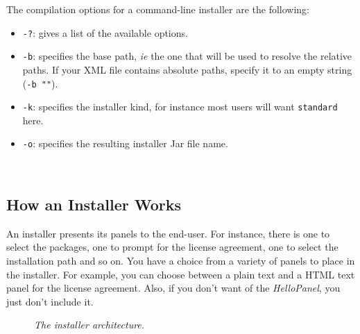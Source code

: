 The compilation options for a command-line installer are the following:
\begin{itemize}
\item \texttt{-?}: gives a list of the available options.
\item \texttt{-b}: specifies the base path, \textsl{ie} the one that will be
used to resolve the relative paths. If your XML file contains absolute paths,
specify it to an empty string (\texttt{-b ""}).
\item \texttt{-k}: specifies the installer kind, for instance most users will
want \texttt{standard} here.
\item \texttt{-o}: specifies the resulting installer Jar file name.
\end{itemize}\

\subsection{How an Installer Works}

An installer presents its panels to the end-user. For instance, there is
one to select the packages, one to prompt for the license agreement, one
to select the installation path and so on. You have a choice from a
variety of panels to place in the installer. For example, you can choose
between a plain text and a HTML text panel for the license agreement.
Also, if you don't want of the \textit{HelloPanel}, you just don't
include it.\\ 

\begin{figure}[h]
\caption{\label{archinstaller}
         \textit{The installer architecture.}}
\begin{center}
\end{center}
\end{figure}

